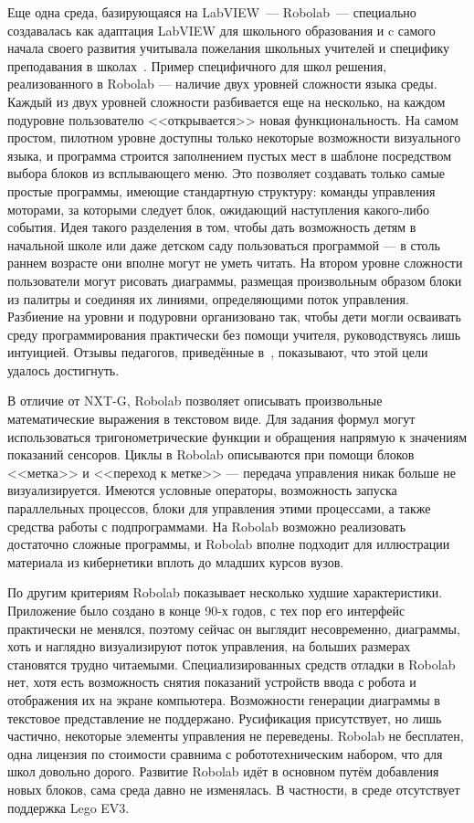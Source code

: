 \documentclass[a5paper]{article}
\begin{document}
Еще одна среда, базирующаяся на LabVIEW~--- Robolab~--- специально создавалась как адаптация LabVIEW 
для школьного образования и c самого начала своего развития учитывала пожелания школьных учителей и специфику 
преподавания в школах~\cite{erwin2000lego,portsmore1999robolab}. Пример специфичного для школ решения, 
реализованного в Robolab --- наличие двух уровней 
сложности языка среды. Каждый из двух уровней сложности разбивается еще на несколько, на каждом подуровне пользователю 
<<открывается>> новая функциональность. На самом простом, пилотном уровне доступны только некоторые возможности 
визуального языка, и программа строится заполнением пустых мест в шаблоне посредством выбора блоков из всплывающего 
меню. Это позволяет создавать только самые простые программы, имеющие стандартную структуру: команды управления 
моторами, за которыми следует блок, ожидающий наступления какого-либо события. Идея такого разделения в том, 
чтобы дать возможность детям в начальной школе или даже детском саду пользоваться программой --- в столь раннем 
возрасте они вполне могут не уметь читать. На втором уровне сложности пользователи могут рисовать диаграммы, 
размещая произвольным образом блоки из палитры и соединяя их линиями, определяющими поток управления. Разбиение 
на уровни и подуровни организовано так, чтобы дети могли осваивать среду программирования практически без помощи 
учителя, руководствуясь лишь интуицией. Отзывы педагогов, приведённые в~\cite{portsmore1999robolab}, 
показывают, что этой цели удалось достигнуть.

В отличие от NXT-G, Robolab позволяет описывать произвольные математические выражения в текстовом виде. Для 
задания формул могут использоваться тригонометрические функции и обращения напрямую к значениям показаний сенсоров. 
Циклы в Robolab описываются при помощи блоков <<метка>> и <<переход к метке>> --- передача управления никак больше 
не визуализируется. Имеются условные операторы, возможность запуска параллельных процессов, блоки для управления 
этими процессами, а также средства работы с подпрограммами. На Robolab возможно реализовать достаточно сложные 
программы, и Robolab вполне подходит для иллюстрации материала из кибернетики вплоть до младших курсов вузов.

По другим критериям Robolab показывает несколько худшие характеристики. Приложение было создано в конце 90-х 
годов, с тех пор его интерфейс практически не менялся, поэтому сейчас он выглядит несовременно, диаграммы, 
хоть и наглядно визуализируют поток управления, на больших размерах становятся трудно читаемыми. Специализированных 
средств отладки в Robolab нет, хотя есть возможность снятия показаний устройств ввода с робота и отображения 
их на экране компьютера. Возможности генерации диаграммы в текстовое представление не поддержано. Русификация 
присутствует, но лишь частично, некоторые элементы управления не переведены. Robolab не бесплатен, одна 
лицензия по стоимости сравнима с робототехническим набором, что для школ довольно дорого. Развитие Robolab 
идёт в основном путём добавления новых блоков, сама среда давно не изменялась. В частности, в среде 
отсутствует поддержка Lego EV3.
\end{document}

